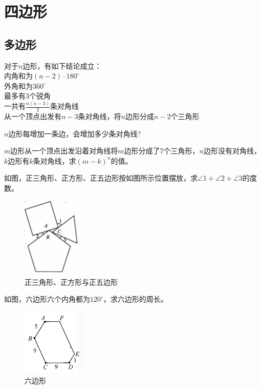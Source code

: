 \documentclass{ecnuthesis}
\begin{document}
\chapter{四边形}
\section{多边形}
\begin{conclusion}
    对于$n$边形，有如下结论成立： \\
    内角和为$(n-2)·180^{\circ}$ \\
    外角和为$360^{\circ}$ \\
    最多有3个锐角 \\
    一共有$\frac{n(n-3)}{2}$条对角线 \\
    从一个顶点出发有$n-3$条对角线，将$n$边形分成$n-2$个三角形 \\
\end{conclusion}
\begin{problem}
    $n$边形每增加一条边，会增加多少条对角线? \\
\end{problem}
\begin{problem}
    $m$边形从一个顶点出发沿着对角线将$m$边形分成了7个三角形，$n$边形没有对角线，$k$边形有$k$条对角线，求$(m-k)^n$的值。\\
\end{problem}
\begin{problem}
    如图，正三角形、正方形、正五边形按如图所示位置摆放，求$\angle 1 +\angle 2 + \angle 3$的度数。
\end{problem}
\begin{figure}[H]
\centering
\includegraphics[width=3cm]{picture/6_1_2.png}
\caption{正三角形、正方形与正五边形}
\end{figure}
\begin{problem}
    如图，六边形六个内角都为$120^\circ$，求六边形的周长。
\end{problem}
\begin{figure}[H]
\centering
\includegraphics[width=3cm]{picture/647.png}
\caption{六边形}
\end{figure}
\end{document}
